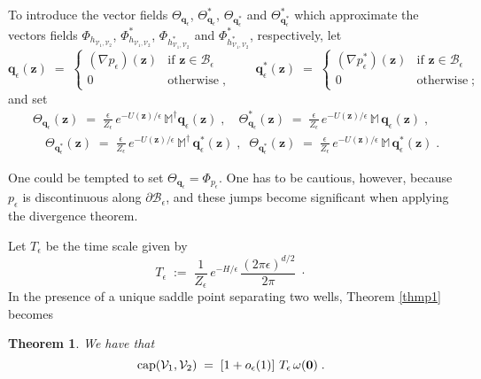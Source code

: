 \documentclass[reqno]{amsart}
\newtheorem{theorem}{Theorem}[section]
\newcounter{as}[section]
\newcommand{\mc}[1]{{\mathcal #1}}
\newcommand{\bb}[1]{{\mathbb #1}}
\newcommand{\bs}[1]{{\boldsymbol #1}}
\newcommand{\<}{\langle}
\renewcommand{\>}{\rangle}
\begin{document}
To introduce the vector fields $\Theta_{\bs{q}_{\epsilon}}$,
$\Theta_{\bs{q}_{\epsilon}}^{*}$, $\Theta_{\bs{q}_{\epsilon}^{*}}$ and
$\Theta_{\bs{q}_{\epsilon}^{*}}^{*}$ which approximate the vectors
fields $\Phi_{h_{\mc{V}_{1},\mc{V}_{2}}}$,
$\Phi_{h_{\mc{V}_{1},\mc{V}_{2}}}^{*}$,
$\Phi_{h_{\mc{V}_{1},\mc{V}_{2}}^{*}}$ and
$\Phi_{h_{\mc{V}_{1},\mc{V}_{2}}^{*}}^{*}$, respectively, let
\begin{equation*}
\bs{q}_{\epsilon}(\bs{z})\;=\;
\begin{cases}
(\nabla p_{\epsilon}) (\bs{z}) & \mbox{if }\bs{z}\in\mc{B}_{\epsilon}\\
0 & \mbox{otherwise}\;,
\end{cases}
\qquad
\bs{q}_{\epsilon}^{*}(\bs{z})\;=\;
\begin{cases}
(\nabla p_{\epsilon}^{*})(\bs{z}) & \mbox{if }\bs{z}\in\mc{B}_{\epsilon}\\
0 & \mbox{otherwise}\;;
\end{cases}
\end{equation*}
and set
\begin{align*}
&  \Theta_{\bs{q}_{\epsilon}}(\bs{z})\;=\;
\frac{\epsilon}{Z_{\epsilon}}\, e^{-U(\bs{z})/\epsilon} \, \bb{M}^{\dagger}
\bs{q}_{\epsilon}(\bs{z})
\;,\quad \Theta_{\bs{q}_{\epsilon}}^{*}(\bs{z})
\;=\; \frac{\epsilon}{Z_{\epsilon}}\, e^{-U(\bs{z})/\epsilon}\,
\bb{M}\, \bs{q}_{\epsilon}(\bs{z})\;,\\
&  \quad\Theta_{\bs{q}_{\epsilon}^{*}}(\bs{z})\;=\;
\frac{\epsilon}{Z_{\epsilon}} \, e^{-U(\bs{z})/\epsilon} \,
\bb{M}^{\dagger} \, \bs{q}_{\epsilon}^{*}(\bs{z})
\;,\;\;\Theta_{\bs{q}_{\epsilon}^{*}}(\bs{z})
\;=\; \frac{\epsilon}{Z_{\epsilon}}\, e^{-U(\bs{z})/\epsilon}
\, \bb{M} \, \bs{q}_{\epsilon}^{*}(\bs{z})\;.
\end{align*}

One could be tempted to set $\Theta_{\bs{q}_{\epsilon}} =
\Phi_{p_{\epsilon}}$. One has to be cautious, however, because
$p_{\epsilon}$ is discontinuous along $\partial\mc{B}_{\epsilon}$, and
these jumps become significant when applying the divergence theorem.

Let $T_{\epsilon}$ be the time scale given by
\begin{equation}
\label{f03}
T_{\epsilon}\;:=\; \frac 1{Z_{\epsilon}}\,e^{- H/\epsilon}
\, \frac{(2\pi \epsilon)^{d/2}}{2\pi} \;\cdot
\end{equation}
In the presence of a unique saddle point separating two wells,
Theorem \ref{thmp1} becomes

\begin{theorem}
\label{tp}
We have that
\begin{equation}
\label{cap1}
\textup{cap}(\mc{V}_{1},\mc{V}_{2})\;=\;
\left[1+o_{\epsilon}(1)\right]\, T_{\epsilon}\, \omega(\bs{0})\;.
\end{equation}
\end{theorem}
\end{document}
